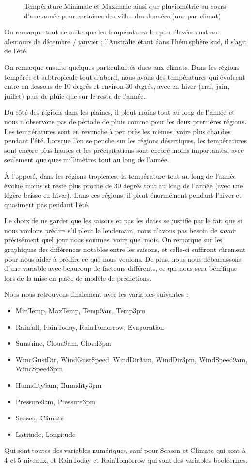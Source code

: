 \documentclass{article}
\begin{document}
\begin{figure}[p]
    \caption{Température Minimale et Maximale ainsi que pluviométrie au cours d'une année pour certaines des villes des données (une par climat)}
    \label{fig:temp_and_rainfall}
\end{figure}

On remarque tout de suite que les températures les plus élevées sont aux alentours de décembre / janvier ; l'Australie étant dans l'hémisphère sud, il s'agit de l'été. 

On remarque ensuite quelques particularités dues aux climats. Dans les régions tempérée et subtropicale tout d'abord, nous avons des températures qui évoluent entre en dessous de 10 degrés et environ 30 degrés, avec en hiver (mai, juin, juillet) plus de pluie que sur le reste de l'année.

Du côté des régions dans les plaines, il pleut moins tout au long de l'année et nous n'observons pas de période de pluie comme pour les deux premières régions. Les températures sont en revanche à peu près les mêmes, voire plus chaudes pendant l'été. Lorsque l'on se penche sur les régions désertiques, les températures sont encore plus hautes et les précipitations sont encore moins importantes, avec seulement quelques millimètres tout au long de l'année. 

À l'opposé, dans les régions tropicales, la température tout au long de l'année évolue moins et reste plus proche de 30 degrés tout au long de l'année (avec une légère baisse en hiver). Dans ces régions, il pleut énormément pendant l'hiver et quasiment pas pendant l'été.

Le choix de ne garder que les saisons et pas les dates se justifie par le fait que si nous voulons prédire s'il pleut le lendemain, nous n'avons pas besoin de savoir précisément quel jour nous sommes, voire quel mois. On remarque sur les graphiques des différences notables entre les saisons, et celle-ci suffiront sûrement pour nous aider à prédire ce que nous voulons. De plus, nous nous débarrassons d'une variable avec beaucoup de facteurs différents, ce qui nous sera bénéfique lors de la mise en place de modèle de prédictions.

Nous nous retrouvons finalement avec les variables suivantes : 
\begin{itemize}
    \item MinTemp, MaxTemp, Temp9am, Temp3pm
    \item Rainfall, RainToday, RainTomorrow, Evaporation
    \item Sunshine, Cloud9am, Cloud3pm
    \item WindGustDir, WindGustSpeed, WindDir9am, WindDir3pm, WindSpeed9am, WindSpeed3pm
    \item Humidity9am, Humidity3pm
    \item Pressure9am, Pressure3pm
    \item Season, Climate
    \item Latitude, Longitude
\end{itemize}
Qui sont toutes des variables numériques, sauf pour Season et Climate qui sont à 4 et 5 niveaux, et RainToday et RainTomorrow qui sont des variables booléennes.
\end{document}
